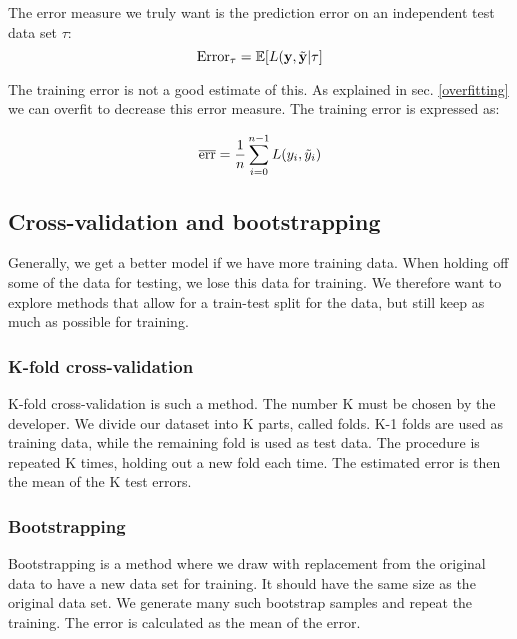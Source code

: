 The error measure we truly want is the prediction error on an independent test data set $\tau$: 
\begin{equation}\label{error_test}
    \text{Error}_{\tau} = \mathbb{E}[L(\mathbf{y},\Tilde{\mathbf{y}} | \tau]
\end{equation}

The training error is not a good estimate of this. As explained in sec. \ref{overfitting} we can overfit to decrease this error measure. The training error is expressed as: 

\begin{equation}
    \overline{\text{err}} = \frac{1}{n}\sum_{i=0}^{n-1} L(y_i, \Tilde{y}_i)
\end{equation}




\subsection{Cross-validation and bootstrapping}

Generally, we get a better model if we have more training data.  When holding off some of the data for testing, we lose this data for training. We therefore want to explore methods that allow for a train-test split for the data, but still keep as much as possible for training. 

\subsubsection{K-fold cross-validation}
K-fold cross-validation is such a method. The number K must be chosen by the developer. We divide our dataset into K parts, called folds. K-1 folds are used as training data, while the remaining fold is used as test data. The procedure is repeated K times, holding out a new fold each time. The estimated error is then the mean of the K test errors. 

\subsubsection{Bootstrapping}
Bootstrapping is a method where we draw with replacement from the original data to have a new data set for training. It should have the same size as the original data set. We generate many such bootstrap samples and repeat the training.  The error is calculated as the mean of the error. 

